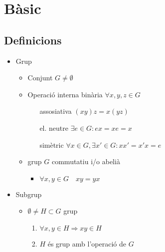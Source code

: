 \section{Bàsic}
\subsection*{Definicions}
\begin{itemize}
\item Grup
	\begin{itemize}
	\item Conjunt $G \neq \emptyset$
	\item Operació interna binària $\forall x, y, z \in G$
		\begin{enumerate}
		\item[assosiativa] $(xy)z = x(yz) $
		\item[el. neutre] $\exists e \in G: ex = xe = x$
		\item[simètric] $\forall x \in G, \exists x' \in G: xx' = x'x = e$
		\end{enumerate}
	\item grup $G$ commutatiu i/o abelià
		\begin{itemize}
		\item $\forall x, y \in G\quad xy = yx$
		\end{itemize}
	\end{itemize}
\item Subgrup
	\begin{itemize}
	\item $\emptyset \neq H \subset G$ grup
		\begin{enumerate}
		\item $\forall x, y \in H \Rightarrow xy \in H$
		\item $H$ és grup amb l'operació de $G$
		\end{enumerate}
	\end{itemize}
\end{itemize}

